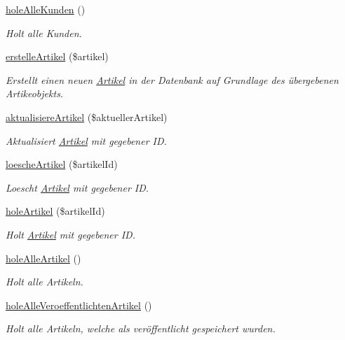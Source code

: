\begin{DoxyCompactItemize}
\hyperlink{classDatabaseModel_ac53cfe4dc2114e8ef29a70ddc11ffefb}{hole\-Alle\-Kunden} ()
\begin{DoxyCompactList}\small\item\em \-Holt alle \-Kunden. \end{DoxyCompactList}\item 
\hyperlink{classDatabaseModel_a1663ad3dbe1ee04ced956ce44ff2923b}{erstelle\-Artikel} (\$artikel)
\begin{DoxyCompactList}\small\item\em \-Erstellt einen neuen \hyperlink{classArtikel}{\-Artikel} in der \-Datenbank auf \-Grundlage des übergebenen \-Artikeobjekts. \end{DoxyCompactList}\item 
\hyperlink{classDatabaseModel_a01cbad70bc79bb9f72bb92ff26682092}{aktualisiere\-Artikel} (\$aktueller\-Artikel)
\begin{DoxyCompactList}\small\item\em \-Aktualisiert \hyperlink{classArtikel}{\-Artikel} mit gegebener \-I\-D. \end{DoxyCompactList}\item 
\hyperlink{classDatabaseModel_aab7854135087ea5d88e6bef29de1043f}{loesche\-Artikel} (\$artikel\-Id)
\begin{DoxyCompactList}\small\item\em \-Loescht \hyperlink{classArtikel}{\-Artikel} mit gegebener \-I\-D. \end{DoxyCompactList}\item 
\hyperlink{classDatabaseModel_adab376d3339580306adab2d56641f61c}{hole\-Artikel} (\$artikel\-Id)
\begin{DoxyCompactList}\small\item\em \-Holt \hyperlink{classArtikel}{\-Artikel} mit gegebener \-I\-D. \end{DoxyCompactList}\item 
\hyperlink{classDatabaseModel_ada4e7c182aa3b00d684965e8392d02ee}{hole\-Alle\-Artikel} ()
\begin{DoxyCompactList}\small\item\em \-Holt alle \-Artikeln. \end{DoxyCompactList}\item 
\hyperlink{classDatabaseModel_a000ed757760b588d6998ef5c180df34f}{hole\-Alle\-Veroeffentlichten\-Artikel} ()
\begin{DoxyCompactList}\small\item\em \-Holt alle \-Artikeln, welche als veröffentlicht gespeichert wurden. \end{DoxyCompactList}\item 

\end{DoxyCompactItemize}
